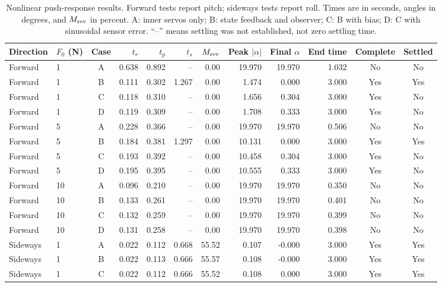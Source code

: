 \begin{table}[!t]
\centering\footnotesize
\caption{Nonlinear push-response results. Forward tests report pitch; sideways tests report roll. Times are in seconds, angles in degrees, and $M_{\rm rev}$ in percent. A: inner servos only; B: state feedback and observer; C: B with bias; D: C with sinusoidal sensor error. ``--'' means settling was not established, not zero settling time.}
\label{tab:push_nonlinear}
\setlength{\tabcolsep}{5pt}
\begin{tabular}{@{}llcrrrrrrrcc@{}}
\toprule
Direction & $F_0$ (N) & Case & $t_r$ & $t_p$ & $t_s$ & $M_{\rm rev}$ & Peak $|\alpha|$ & Final $\alpha$ & End time & Complete & Settled\\
\midrule
Forward & 1 & A & 0.638 & 0.892 & -- & 0.00 & 19.970 & 19.970 & 1.032 & No & No\\
Forward & 1 & B & 0.111 & 0.302 & 1.267 & 0.00 & 1.474 & 0.000 & 3.000 & Yes & Yes\\
Forward & 1 & C & 0.118 & 0.310 & -- & 0.00 & 1.656 & 0.304 & 3.000 & Yes & No\\
Forward & 1 & D & 0.119 & 0.309 & -- & 0.00 & 1.708 & 0.333 & 3.000 & Yes & No\\
\midrule
Forward & 5 & A & 0.228 & 0.366 & -- & 0.00 & 19.970 & 19.970 & 0.506 & No & No\\
Forward & 5 & B & 0.184 & 0.381 & 1.297 & 0.00 & 10.131 & 0.000 & 3.000 & Yes & Yes\\
Forward & 5 & C & 0.193 & 0.392 & -- & 0.00 & 10.458 & 0.304 & 3.000 & Yes & No\\
Forward & 5 & D & 0.195 & 0.395 & -- & 0.00 & 10.555 & 0.333 & 3.000 & Yes & No\\
\midrule
Forward & 10 & A & 0.096 & 0.210 & -- & 0.00 & 19.970 & 19.970 & 0.350 & No & No\\
Forward & 10 & B & 0.133 & 0.261 & -- & 0.00 & 19.970 & 19.970 & 0.401 & No & No\\
Forward & 10 & C & 0.132 & 0.259 & -- & 0.00 & 19.970 & 19.970 & 0.399 & No & No\\
Forward & 10 & D & 0.131 & 0.258 & -- & 0.00 & 19.970 & 19.970 & 0.398 & No & No\\
\midrule
Sideways & 1 & A & 0.022 & 0.112 & 0.668 & 55.52 & 0.107 & -0.000 & 3.000 & Yes & Yes\\
Sideways & 1 & B & 0.022 & 0.113 & 0.666 & 55.57 & 0.108 & -0.000 & 3.000 & Yes & Yes\\
Sideways & 1 & C & 0.022 & 0.112 & 0.666 & 55.52 & 0.108 & 0.000 & 3.000 & Yes & Yes\\

\end{tabular}
\end{table}
